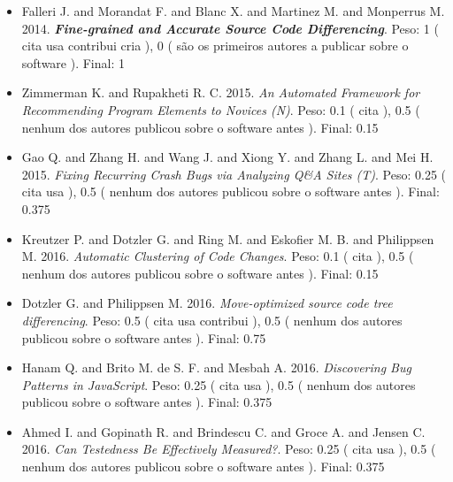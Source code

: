\begin{itemize}
\item Falleri J. and Morandat F. and Blanc X. and Martinez M. and Monperrus M.
      2014.
        \textbf{\textit{ Fine-grained and Accurate Source Code Differencing}}.
      Peso:
      1 (
          cita
          usa
          contribui
          cria
      ),
      0 (
são os primeiros autores a publicar sobre o software
      ).
      Final:
      1

\item Zimmerman K. and Rupakheti R. C.
      2015.
        \textit{ An Automated Framework for Recommending Program Elements to Novices (N)}.
      Peso:
      0.1 (
          cita
      ),
      0.5 (
nenhum dos autores publicou sobre o software antes
      ).
      Final:
      0.15

\item Gao Q. and Zhang H. and Wang J. and Xiong Y. and Zhang L. and Mei H.
      2015.
        \textit{ Fixing Recurring Crash Bugs via Analyzing Q\&A Sites (T)}.
      Peso:
      0.25 (
          cita
          usa
      ),
      0.5 (
nenhum dos autores publicou sobre o software antes
      ).
      Final:
      0.375

\item Kreutzer P. and Dotzler G. and Ring M. and Eskofier M. B. and Philippsen M.
      2016.
        \textit{ Automatic Clustering of Code Changes}.
      Peso:
      0.1 (
          cita
      ),
      0.5 (
nenhum dos autores publicou sobre o software antes
      ).
      Final:
      0.15

\item Dotzler G. and Philippsen M.
      2016.
        \textit{ Move-optimized source code tree differencing}.
      Peso:
      0.5 (
          cita
          usa
          contribui
      ),
      0.5 (
nenhum dos autores publicou sobre o software antes
      ).
      Final:
      0.75

\item Hanam Q. and Brito M. de S. F. and Mesbah A.
      2016.
        \textit{ Discovering Bug Patterns in JavaScript}.
      Peso:
      0.25 (
          cita
          usa
      ),
      0.5 (
nenhum dos autores publicou sobre o software antes
      ).
      Final:
      0.375

\item Ahmed I. and Gopinath R. and Brindescu C. and Groce A. and Jensen C.
      2016.
        \textit{ Can Testedness Be Effectively Measured?}.
      Peso:
      0.25 (
          cita
          usa
      ),
      0.5 (
nenhum dos autores publicou sobre o software antes
      ).
      Final:
      0.375


\end{itemize}
